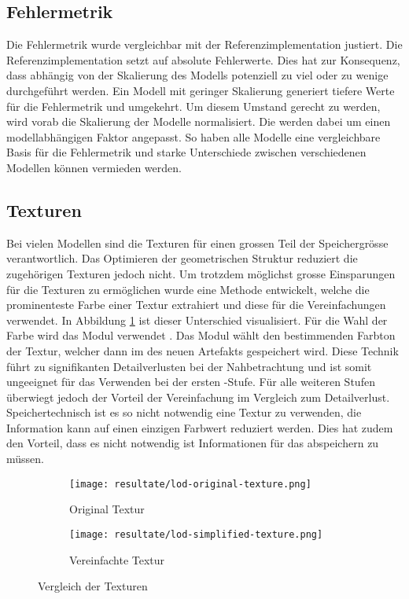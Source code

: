 \subsection{Fehlermetrik}

Die Fehlermetrik wurde vergleichbar mit der Referenzimplementation justiert. Die Referenzimplementation setzt auf absolute Fehlerwerte. Dies hat zur Konsequenz, dass abhängig von der Skalierung des Modells potenziell zu viel oder zu wenige  durchgeführt werden. Ein Modell mit geringer Skalierung generiert tiefere Werte für die Fehlermetrik und umgekehrt. Um diesem Umstand gerecht zu werden, wird vorab die Skalierung der Modelle normalisiert. Die  werden dabei um einen modellabhängigen Faktor angepasst. So haben alle Modelle eine vergleichbare Basis für die Fehlermetrik und starke Unterschiede zwischen verschiedenen Modellen können vermieden werden.

\subsection{Texturen}

Bei vielen Modellen sind die Texturen für einen grossen Teil der Speichergrösse verantwortlich. Das Optimieren der geometrischen Struktur reduziert die zugehörigen Texturen jedoch nicht. Um trotzdem möglichst grosse Einsparungen für die Texturen zu ermöglichen wurde eine Methode entwickelt, welche die prominenteste Farbe einer Textur extrahiert und diese für die Vereinfachungen verwendet.
In Abbildung \ref{fig:textureComparison} ist dieser Unterschied visualisiert. Für die Wahl der Farbe wird das Modul  verwendet \cite{averageColorPackage}. Das Modul wählt den bestimmenden Farbton der Textur, welcher dann im  des neuen Artefakts gespeichert wird.
Diese Technik führt zu signifikanten Detailverlusten bei der Nahbetrachtung und ist somit ungeeignet für das Verwenden bei der ersten -Stufe. Für alle weiteren Stufen überwiegt jedoch der Vorteil der Vereinfachung im Vergleich zum Detailverlust.
Speichertechnisch ist es so nicht notwendig eine Textur zu verwenden, die Information kann auf einen einzigen Farbwert reduziert werden. Dies hat zudem den Vorteil, dass es nicht notwendig ist Informationen für das  abspeichern zu müssen.

\begin{figure}[H]
  \centering
  \begin{subfigure}{.4\textwidth}
    \centering
    \texttt{[image: resultate/lod-original-texture.png]}
    \caption{Original Textur}
  \end{subfigure}
  \begin{subfigure}{.4\textwidth}
    \centering
    \texttt{[image: resultate/lod-simplified-texture.png]}
    \caption{Vereinfachte Textur}
  \end{subfigure}
  \caption{Vergleich der Texturen}
  \label{fig:textureComparison}
\end{figure}

